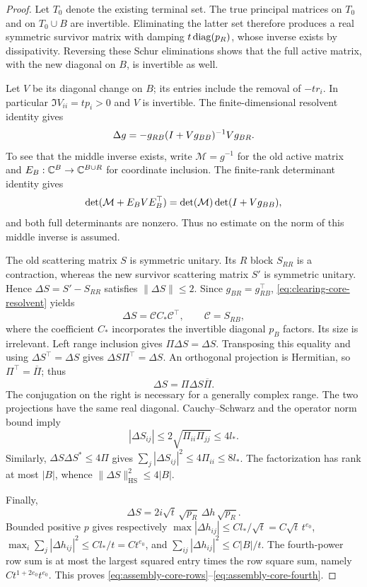 \begin{proof}
Let $T_0$ denote the existing terminal set. The true principal matrices on
$T_0$ and on $T_0\cup B$ are invertible.  Eliminating the latter set therefore
produces a real symmetric survivor matrix with damping $t\operatorname{diag}(p_R)$,
whose inverse exists by dissipativity.  Reversing these Schur eliminations
shows that the full active matrix, with the new diagonal on $B$, is
invertible as well.

Let $V$ be its diagonal change on $B$; its entries include the removal
of $-tr_i$.  In particular $\Im V_{ii}=tp_i>0$ and $V$ is invertible.
The finite-dimensional resolvent identity gives
\begin{equation}\label{eq:clearing-core-resolvent}
 \Delta g=-g_{RB}(I+Vg_{BB})^{-1}Vg_{BR}.
\end{equation}
To see that the middle inverse exists, write $\mathcal M=g^{-1}$ for
the old active matrix and $E_B:\mathbb C^B\to\mathbb C^{B\cup R}$ for coordinate
inclusion.  The finite-rank determinant identity gives
\[
 \det(\mathcal M+E_BVE_B^\top)
       =\det(\mathcal M)\det(I+Vg_{BB}),
\]
and both full determinants are nonzero.  Thus no estimate on the norm of
this middle inverse is assumed.

The old scattering matrix $S$ is symmetric unitary.  Its $R$ block
$S_{RR}$ is a contraction, whereas the new survivor scattering matrix $S'$
is symmetric unitary.  Hence $\Delta S=S'-S_{RR}$ satisfies
$\|\Delta S\|\le2$.
Since $g_{BR}=g_{RB}^\top$, \eqref{eq:clearing-core-resolvent} yields
\[
 \Delta S=\mathcal C C_*\mathcal C^\top,\qquad \mathcal C=S_{RB},
\]
where the coefficient $C_*$ incorporates the invertible diagonal $p_B$
factors.  Its size is irrelevant.  Left range inclusion gives
$\Pi\Delta S=\Delta S$.  Transposing this equality and using
$\Delta S^\top=\Delta S$ gives $\Delta S\Pi^\top=\Delta S$.
An orthogonal projection is Hermitian, so $\Pi^\top=\overline\Pi$; thus
\begin{equation}\label{eq:clearing-core-support}
 \Delta S=\Pi\Delta S\overline\Pi.
\end{equation}
The conjugation on the right is necessary for a generally complex range.
The two projections have the same real diagonal.  Cauchy--Schwarz and the
operator norm bound imply
\[
 |\Delta S_{ij}|\le2\sqrt{\Pi_{ii}\Pi_{jj}}\le4l_*.
\]
Similarly, $\Delta S\Delta S^*\le4\Pi$ gives
$\sum_j|\Delta S_{ij}|^2\le4\Pi_{ii}\le8l_*$.
The factorization has rank at most $|B|$, whence
$\|\Delta S\|_{\mathrm{HS}}^2\le4|B|$.

Finally,
\[
 \Delta S=2i\sqrt t\,\sqrt{p_R}\,\Delta h\,\sqrt{p_R}.
\]
Bounded positive $p$ gives respectively
$\max|\Delta h_{ij}|\le Cl_*/\sqrt t=C\sqrt t\,t^{e_0}$,
$\max_i\sum_j|\Delta h_{ij}|^2\le Cl_*/t=Ct^{e_0}$, and
$\sum_{ij}|\Delta h_{ij}|^2\le C|B|/t$.
The fourth-power row sum is at most the largest squared entry times the
row square sum, namely $Ct^{1+2e_0}t^{e_0}$.
This proves \eqref{eq:assembly-core-rows}--\eqref{eq:assembly-core-fourth}.
\end{proof}

